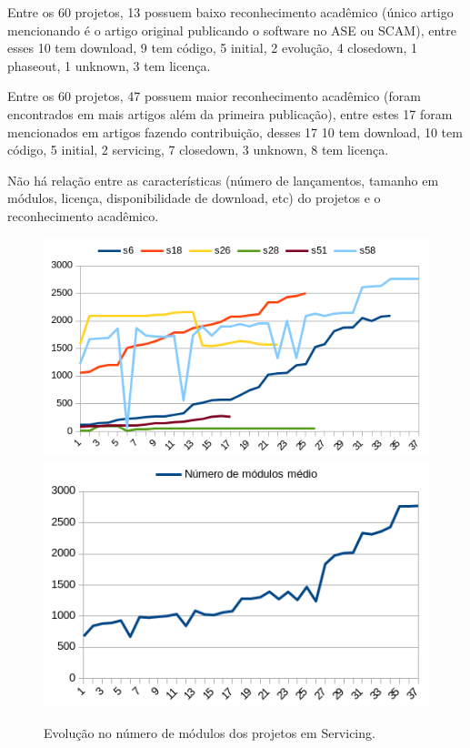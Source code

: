 Entre os 60 projetos, 13 possuem baixo reconhecimento acadêmico (único artigo
mencionando é o artigo original publicando o software no ASE ou SCAM), entre
esses 10 tem download, 9 tem código, 5 initial, 2 evolução, 4 closedown, 1
phaseout, 1 unknown, 3 tem licença.

Entre os 60 projetos, 47 possuem maior reconhecimento acadêmico (foram
encontrados em mais artigos além da primeira publicação), entre estes 17 foram
mencionados em artigos fazendo contribuição, desses 17 10 tem download, 10 tem
código, 5 initial, 2 servicing, 7 closedown, 3 unknown, 8 tem licença.

Não há relação entre as características (número de lançamentos, tamanho em
módulos, licença, disponibilidade de download, etc) do projetos e o
reconhecimento acadêmico.



\begin{figure}[h]
  \center
  \includegraphics[scale=0.6]{imagens/modules-evolution-servicing.png}
  \includegraphics[scale=0.6]{imagens/modules-evolution-average.png}
  \caption{Evolução no número de módulos dos projetos em Servicing.}
  \label{modules-evolution-servicing}
\end{figure}

